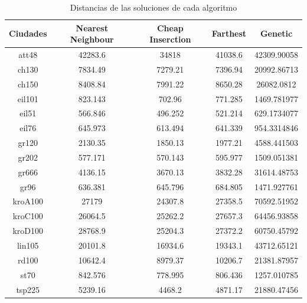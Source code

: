 \documentclass{article}
\begin{document}
\begin{table}[h]
  \centering
  \begin{tabular}{|c|c|c|c|c|}
    \hline
    Ciudades & Nearest Neighbour & Cheap Inserction & Farthest & Genetic \\ \hline 
    att48 & 42283.6 & 34818 & 41038.6 & 42309.90058 \\
    ch130 & 7834.49 & 7279.21 & 7396.94 & 20992.86713 \\
    ch150 & 8408.84 & 7991.22 & 8650.28 & 26082.0812 \\
    eil101 & 823.143 & 702.96 & 771.285 & 1469.781977 \\
    eil51 & 566.846 & 496.252 & 521.214 & 629.1734077 \\
    eil76 & 645.973 & 613.494 & 641.339 & 954.3314846 \\
    gr120 & 2130.35 & 1850.13 & 1977.21 & 4588.441503 \\
    gr202 & 577.171 & 570.143 & 595.977 & 1509.051381 \\
    gr666 & 4136.15 & 3670.13 & 3832.28 & 31614.48753 \\
    gr96 & 636.381 & 645.796 & 684.805 & 1471.927761 \\
    kroA100 & 27179 & 24307.8 & 27358.5 & 70592.51952 \\
    kroC100 & 26064.5 & 25262.2 & 27657.3 & 64456.93858 \\
    kroD100 & 28768.9 & 25204.3 & 27372.2 & 60750.45792 \\
    lin105 & 20101.8 & 16934.6 & 19343.1 & 43712.65121 \\
    rd100 & 10642.4 & 8979.37 & 10206.7 & 21381.87957 \\
    st70 & 842.576 & 778.995 & 806.436 & 1257.010785 \\
    tsp225 & 5239.16 & 4468.2 & 4871.17 & 21880.47456 \\ \hline
  \end{tabular}
  \caption{Distancias de las soluciones de cada algoritmo}
\end{table}
\end{document}
